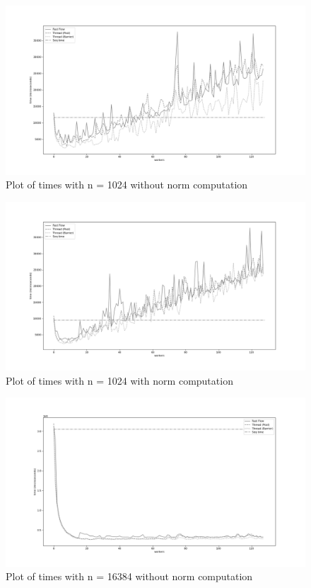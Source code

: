 \documentclass[12pt]{extarticle}
\begin{document}

\begin{figure}[H]
\centering
    \includegraphics[width=18cm, center]{./plots/times_1024_0.png}
    \caption{Plot of times with n = 1024 without norm computation}
\end{figure}

\begin{figure}[H]
\centering
    \includegraphics[width=18cm, center]{./plots/times_1024_1.png}
    \caption{Plot of times with n = 1024 with norm computation}
\end{figure} 

\begin{figure}[H]
\centering
    \includegraphics[width=18cm, center]{./plots/times_16384_0.png}
    \caption{Plot of times with n = 16384 without norm computation}
\end{figure}
\end{document}
